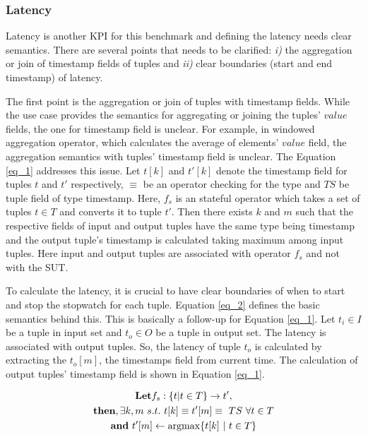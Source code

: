\subsubsection{Latency}
\label{sec_latency}
Latency is another KPI for this benchmark and defining the latency needs clear semantics. There are several points that needs to be clarified: \textit{i)} the aggregation or join of timestamp fields of tuples and \textit{ii)} clear boundaries (start and end timestamp) of latency.

The first point is the aggregation or join of tuples with timestamp fields. While the use case provides the semantics for aggregating or joining the tuples' $value$ fields, the one for timestamp field is unclear. For example, in windowed aggregation operator, which calculates the average of elements' $value$ field, the aggregation semantics with tuples' timestamp field is unclear.  The Equation \ref{eq_1} addresses this issue. Let $t[k]$ and $t'[k]$ denote the timestamp field for tuples $t$ and $t'$ respectively,  $\equiv$ be an operator checking for the type and $TS$ be tuple field of type timestamp. Here, $f_{s}$ is an stateful operator which takes a set of tuples $t \in T$ and converts it to tuple $t'$. Then there exists $k$ and $m$ such that the respective fields of input and output tuples have the same type being timestamp and the output tuple's timestamp is calculated taking maximum among input tuples. Here input and output tuples are associated with operator $f_{s}$ and not with the SUT.

To calculate the latency, it is crucial to have clear boundaries of when to start and stop the stopwatch for each tuple. Equation \ref{eq_2} defines the basic semantics behind this. This is basically a follow-up for Equation \ref{eq_1}. Let $t_{i} \in I$ be a tuple in input set and $t_{o} \in O$ be a tuple in output set. The latency is associated with output tuples. So, the latency of tuple $t_{o}$ is calculated by extracting the $t_{o}[m]$, the timestamps field from current time. The calculation of output tuples' timestamp field is shown in Equation \ref{eq_1}. 


\begin{equation}
  \begin{gathered}
\textbf{Let} f_{s}:\{t| t\in T \} \to t'  , \\
  \textbf{then}, \exists k,m \ s.t. \ t[k]  \equiv t'[m] \equiv \ TS \ \forall t \in T\\
  \textbf{and} \ t'[m] \gets \argmax\{t[k] \ | \ t \in T\}  
    \end{gathered}
      \label{eq_1} 
  \end{equation}

